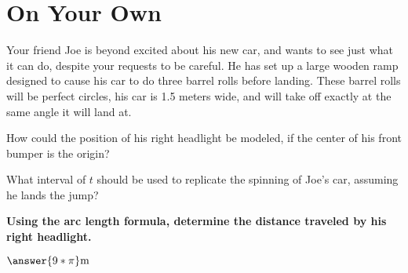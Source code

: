 \documentclass{ximera}
\begin{document}
\section{On Your Own}
\begin{question}
\item Your friend Joe is beyond excited about his new car, and wants to see just what it can do, despite your requests to be careful. He has set up a large wooden ramp designed to cause his car to do three barrel rolls before landing. These barrel rolls will be perfect circles, his car is 1.5 meters wide, and will take off exactly at the same angle it will land at.

How could the position of his right headlight be modeled, if the center of his front bumper is the origin?

\begin{multipleChoice}
\end{multipleChoice}

What interval of $t$ should be used to replicate the spinning of Joe's car, assuming he lands the jump?

\begin{multipleChoice}
\end{multipleChoice}

\textbf{Using the arc length formula, determine the distance traveled by his right headlight.}

\begin{onlineOnly}
\begin{sageCell}

\end{sageCell}
\end{onlineOnly}

$\answer{9*\pi}\text{m}$
\end{question}
\end{document}
